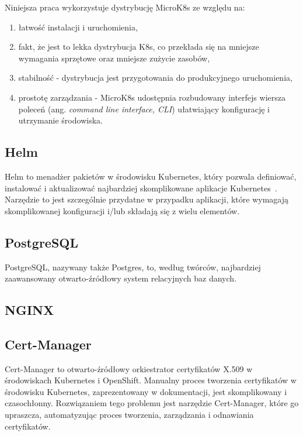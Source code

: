 Niniejsza praca wykorzystuje dystrybucję MicroK8s\cite{microk8s-docs-home} ze względu na:
\begin{enumerate}
    \item łatwość instalacji i uruchomienia,
    \item fakt, że jest to lekka dystrybucja K8s, co przekłada się na mniejsze wymagania sprzętowe oraz mniejsze zużycie zasobów,
    \item stabilność - dystrybucja jest przygotowania do produkcyjnego uruchomienia,
    \item prostotę zarządzania - MicroK8s udostępnia rozbudowany interfejs wiersza poleceń (ang. \emph{command line interface, CLI}) ułatwiający konfigurację i utrzymanie środowiska.
\end{enumerate}

\subsection{Helm}\label{subsec:helm}

Helm to menadżer pakietów w środowisku Kubernetes, który pozwala definiować, instalować i aktualizować najbardziej skomplikowane aplikacje Kubernetes~\cite{helm-home}.
Narzędzie to jest szczególnie przydatne w przypadku aplikacji, które wymagają skomplikowanej konfiguracji i/lub składają się z wielu elementów.

\subsection{PostgreSQL}\label{subsec:postgresql}

PostgreSQL, nazywany także Postgres, to, według twórców, najbardziej zaawansowany otwarto-źródłowy system relacyjnych baz danych\cite{postgresql-home}.

\subsection{NGINX}\label{subsec:nginx}


\subsection{Cert-Manager}\label{subsec:cert-manager}

Cert-Manager to otwarto-źródłowy orkiestrator certyfikatów X.509 w środowiskach Kubernetes i OpenShift\cite{cert-manager-home}.
Manualny proces tworzenia certyfikatów w środowisku Kubernetes, zaprezentowany w dokumentacji\cite{kubernetes-generate-certificates-manually}, jest skomplikowany i czasochłonny.
Rozwiązaniem tego problemu jest narzędzie Cert-Manager, które go upraszcza, automatyzując proces tworzenia, zarządzania i odnawiania certyfikatów.

